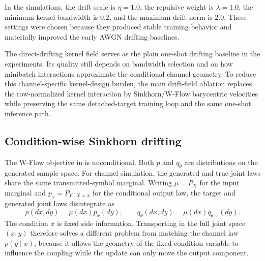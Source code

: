 \documentclass[10pt,journal]{IEEEtran}
\begin{document}
In the simulations, the drift scale is \(\eta=1.0\), the repulsive weight is \(\lambda=1.0\), the minimum kernel bandwidth is \(0.2\), and the maximum drift norm is \(2.0\).
These settings were chosen because they produced stable training behavior and materially improved the early AWGN drifting baselines.

The direct-drifting kernel field serves as the plain one-shot drifting baseline in the experiments.
Its quality still depends on bandwidth selection and on how minibatch interactions approximate the conditional channel geometry.
To reduce this channel-specific kernel-design burden, the main drift-field ablation replaces the row-normalized kernel interaction by Sinkhorn/W-Flow barycentric velocities while preserving the same detached-target training loop and the same one-shot inference path.

\subsection{Condition-wise Sinkhorn drifting}
The W-Flow objective in \cite{han2026wflow} is unconditional.
Both \(p\) and \(q_\theta\) are distributions on the generated sample space.
For channel simulation, the generated and true joint laws share the same transmitted-symbol marginal.
Writing \(\mu=P_X\) for the input marginal and \(p_x=P_{Y\mid X=x}\) for the conditional output law, the target and generated joint laws disintegrate as
\begin{equation}
p(dx,dy)=\mu(dx)p_x(dy),
\qquad
q_\theta(dx,dy)=\mu(dx)q_{\theta,x}(dy).
\end{equation}
The condition \(x\) is fixed side information.
Transporting in the full joint space \((x,y)\) therefore solves a different problem from matching the channel law \(p(y\mid x)\), because it allows the geometry of the fixed condition variable to influence the coupling while the update can only move the output component.
\end{document}

